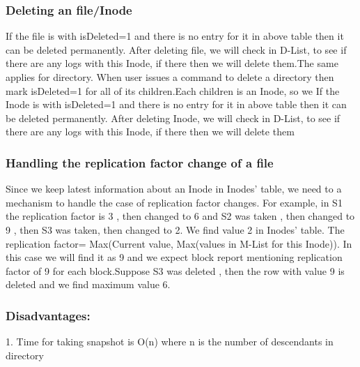 \subsubsection{\textbf{Deleting an file/Inode}}
If the file is with isDeleted=1 and there is no entry for it in above table then it can be deleted permanently. After deleting file, we will check in D-List, to see if there are any logs with this Inode, if there then we will delete them.The same applies for directory. When user issues a command to delete a directory then mark isDeleted=1 for all of its children.Each children is an Inode, so we If the Inode is with isDeleted=1 and there is no entry for it in above table then it can be deleted permanently. After deleting Inode, we will check in D-List, to see if there are any logs with this Inode, if there then we will delete them

\subsubsection{\textbf{Handling the replication factor change of a file}}

Since we keep latest information about an Inode in Inodes’ table, we need to a mechanism to handle the case of replication factor changes. For example, in S1 the replication factor is 3 , then changed to 6 and S2 was taken , then changed to 9 , then S3 was taken, then changed to 2.
We find value 2 in Inodes’ table. The replication factor= Max(Current value, Max(values in M-List for this Inode)). In this case we will find it as 9 and we expect block report mentioning replication factor of 9 for each block.Suppose S3 was deleted , then the row with value 9 is deleted and we find maximum value 6. 

\subsubsection{\textbf{Disadvantages:}}
1. Time for taking snapshot is O(n) where n is the number of descendants  in directory 










